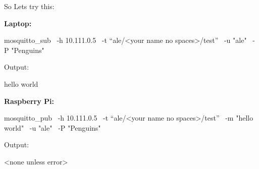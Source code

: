 \begin{frame}
	{So Lets try this:}

	\begin{multicols}{2}
		\textbf{Laptop:}
		\begin{raw}[fontsize=\small]
mosquitto_sub \
	-h 10.111.0.5 \
	-t “ale/<your name no spaces>/test” \
	-u "ale" \
	-P "Penguins"
\end{raw}
		Output:
		\begin{raw}[fontsize=\small]
hello world
\end{raw}

		\vfill\null
		\columnbreak

		\textbf{Raspberry Pi:}

		\begin{raw}[fontsize=\small]
mosquitto_pub \
	-h 10.111.0.5 \
	-t “ale/<your name no spaces>/test” \
	-m "hello world" \
	-u "ale" \
	-P "Penguins"
\end{raw}
		Output:
		\begin{raw}[fontsize=\small]
<none unless error>
\end{raw}

	\end{multicols}

\end{frame}

\cprotect\note{
}

